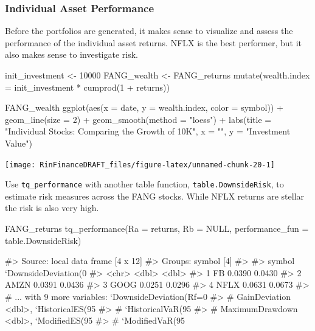 \subsubsection{Individual Asset
Performance}\label{individual-asset-performance}

Before the portfolios are generated, it makes sense to visualize and
assess the performance of the individual asset returns. NFLX is the best
performer, but it also makes sense to investigate risk.

\begin{Schunk}
\begin{Sinput}
init_investment <- 10000
FANG_wealth <- FANG_returns %
    mutate(wealth.index = init_investment * cumprod(1 + returns))

FANG_wealth %
    ggplot(aes(x = date, y = wealth.index, color = symbol)) +
    geom_line(size = 2) +
    geom_smooth(method = "loess") +
    labs(title = "Individual Stocks: Comparing the Growth of 10K", x = "", y = "Investment Value")
\end{Sinput}


\begin{center}\texttt{[image: RinFinanceDRAFT\_files/figure-latex/unnamed-chunk-20-1]} \end{center}

\end{Schunk}

Use \texttt{tq\_performance} with another table function,
\texttt{table.DownsideRisk}, to estimate risk measures across the FANG
stocks. While NFLX returns are stellar the risk is also very high.

\begin{Schunk}
\begin{Sinput}
FANG_returns %
    tq_performance(Ra = returns, Rb = NULL, performance_fun = table.DownsideRisk)
\end{Sinput}
\begin{Soutput}
#> Source: local data frame [4 x 12]
#> Groups: symbol [4]
#> 
#>   symbol `DownsideDeviation(0%
#>    <chr>                   <dbl>                        <dbl>
#> 1     FB                  0.0390                       0.0430
#> 2   AMZN                  0.0391                       0.0436
#> 3   GOOG                  0.0251                       0.0296
#> 4   NFLX                  0.0631                       0.0673
#> # ... with 9 more variables: `DownsideDeviation(Rf=0%
#> #   GainDeviation <dbl>, `HistoricalES(95%
#> #   `HistoricalVaR(95%
#> #   MaximumDrawdown <dbl>, `ModifiedES(95%
#> #   `ModifiedVaR(95%
\end{Soutput}
\end{Schunk}

